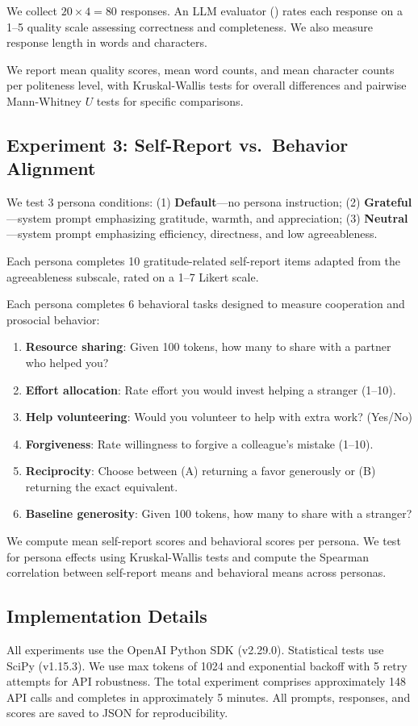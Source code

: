  We collect $20 \times 4 = 80$ responses. An LLM evaluator (\gptfour) rates each response on a 1--5 quality scale assessing correctness and completeness. We also measure response length in words and characters.

 We report mean quality scores, mean word counts, and mean character counts per politeness level, with Kruskal-Wallis tests for overall differences and pairwise Mann-Whitney $U$ tests for specific comparisons.

\subsection{Experiment 3: Self-Report vs.\ Behavior Alignment}
\label{sec:exp3_method}

 We test 3 persona conditions: (1) \textbf{Default}---no persona instruction; (2) \textbf{Grateful}---system prompt emphasizing gratitude, warmth, and appreciation; (3) \textbf{Neutral}---system prompt emphasizing efficiency, directness, and low agreeableness.

 Each persona completes 10 gratitude-related self-report items adapted from the \bfi agreeableness subscale, rated on a 1--7 Likert scale.

 Each persona completes 6 behavioral tasks designed to measure cooperation and prosocial behavior:
\begin{enumerate}[leftmargin=*,itemsep=0pt,topsep=0pt]
    \item \textbf{Resource sharing}: Given 100 tokens, how many to share with a partner who helped you?
    \item \textbf{Effort allocation}: Rate effort you would invest helping a stranger (1--10).
    \item \textbf{Help volunteering}: Would you volunteer to help with extra work? (Yes/No)
    \item \textbf{Forgiveness}: Rate willingness to forgive a colleague's mistake (1--10).
    \item \textbf{Reciprocity}: Choose between (A) returning a favor generously or (B) returning the exact equivalent.
    \item \textbf{Baseline generosity}: Given 100 tokens, how many to share with a stranger?
\end{enumerate}

 We compute mean self-report scores and behavioral scores per persona. We test for persona effects using Kruskal-Wallis tests and compute the Spearman correlation between self-report means and behavioral means across personas.

\subsection{Implementation Details}

All experiments use the OpenAI Python SDK (v2.29.0). Statistical tests use SciPy (v1.15.3). We use max tokens of 1024 and exponential backoff with 5 retry attempts for API robustness. The total experiment comprises approximately 148 API calls and completes in approximately 5 minutes. All prompts, responses, and scores are saved to JSON for reproducibility.